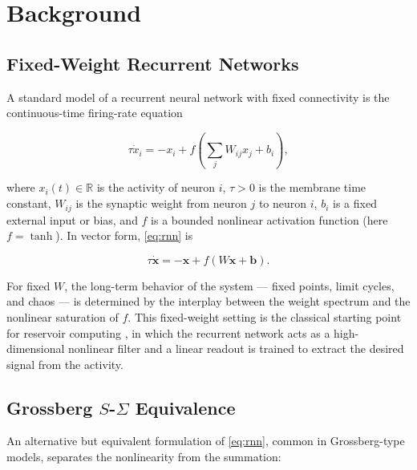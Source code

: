 \documentclass[paper=a4, fontsize=11pt]{scrartcl} %
\numberwithin{equation}{section} %
\numberwithin{figure}{section} %
\numberwithin{table}{section} %
\begin{document}

\section{Background}

\subsection{Fixed-Weight Recurrent Networks}

A standard model of a recurrent neural network with fixed connectivity is the
continuous-time firing-rate equation

\begin{equation}
    \tau \dot{x}_i = -x_i + f\!\left(\sum_j W_{ij} x_j + b_i\right),
    \label{eq:rnn}
\end{equation}

where $x_i(t) \in \mathbb{R}$ is the activity of neuron $i$, $\tau > 0$ is the
membrane time constant, $W_{ij}$ is the synaptic weight from neuron $j$ to neuron $i$,
$b_i$ is a fixed external input or bias, and $f$ is a bounded nonlinear activation
function (here $f = \tanh$).  In vector form, \eqref{eq:rnn} is

\begin{equation}
    \tau \dot{\mathbf{x}} = -\mathbf{x} + f(W\mathbf{x} + \mathbf{b}).
\end{equation}

For fixed $W$, the long-term behavior of the system — fixed points, limit cycles,
and chaos — is determined by the interplay between the weight spectrum and the
nonlinear saturation of $f$.  This fixed-weight setting is the classical starting
point for reservoir computing \cite{sompolinsky1988chaos}, in which the recurrent
network acts as a high-dimensional nonlinear filter and a linear readout is
trained to extract the desired signal from the activity.

\subsection{Grossberg \(S\)-\(\Sigma\) Equivalence}

An alternative but equivalent formulation of \eqref{eq:rnn}, common in
Grossberg-type models, separates the nonlinearity from the summation:
\end{document}
